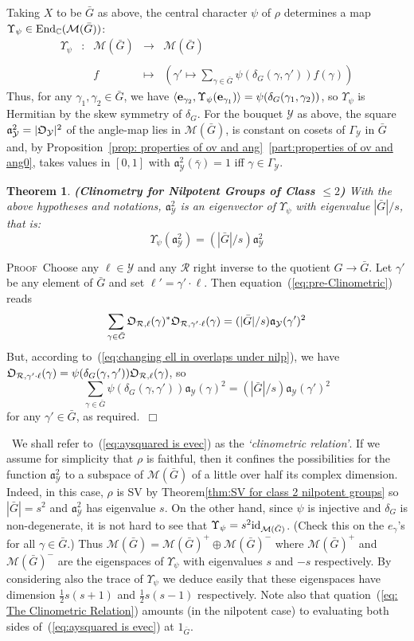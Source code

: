 \documentclass[12pt]{article}
\newtheorem{thm}{Theorem}[section]
\newcommand{\bbC}{\ensuremath{\mathbb{C}}}\newcommand{\bbCp}{\ensuremath{\mathbb{C}_p}}
\newcommand{\be}{\ensuremath{{\bf e}}}
\newcommand{\bPf}{\noindent \textsc{Proof\ }}
\newcommand{\cM}{\mathcal{M}}
\newcommand{\cR}{\ensuremath{\mathcal{R}}}
\newcommand{\cY}{\ensuremath{\mathcal{Y}}}
\newcommand{\displaymapdef}[5]
{
	\begin{array}{rcrcl}
		#1 &:& #2 &\longrightarrow& #3 \\
		& &    &                    \\
		& & #4 &\longmapsto    & #5
	\end{array}
}
\newcommand{\End}{{\rm End}}
\newcommand{\ePf}{~$\Box$\vertsp\par}%
\newcommand{\fa}{\ensuremath{\mathfrak{a}}}
\newcommand{\half}{\frac{1}{2}}
\newcommand{\id}{{\rm id}}
\renewcommand{\rem}{\refstepcounter{rem}\noindent{\sc Remark \therem}}
\renewcommand{\therem}{\thesection.\arabic{rem}}
\newcommand{\vertsp}{\vspace{1ex}}
\newcommand{\barG}{\ensuremath{\bar{G}}}
\newcommand{\cAng}{{\frak O}}
\begin{document}
Taking $X$ to be $\bar G$ as above, the central character $\psi$ of $\rho$ determines a map $\Upsilon_\psi\in\End_\bbC(\cM(\bar G))$: 
$$
\displaymapdef{\Upsilon_\psi}{\cM(\bar G)}{\cM(\bar G)}{f}
{\left(\gamma'\mapsto \sum_{\gamma\in \bar G }\psi(\delta_G(\gamma,\gamma'))f(\gamma)\right)}
$$
Thus, for any $\gamma_1,\gamma_2\in \bar G$, we have $\left\langle \be_{\gamma_2}, \Upsilon_\psi(\be_{\gamma_1})\right\rangle =\psi(\delta_G(\gamma_1,\gamma_2))$, so $\Upsilon_\psi$ is Hermitian by the skew symmetry of $\delta_G$. 
For the bouquet $\cY$ as above, the square $\fa_\cY^2=|\cAng_\cY|^2$ of the angle-map lies in $\cM(\bar G)$, is constant on cosets of $\Gamma_\cY$ in $\barG$ and, by Proposition~\ref{prop: properties of ov and ang}~\ref{part:properties of ov and ang0}, takes values in $[0,1]$ with
$\fa_\cY^2(\bar{\gamma})=1$ iff $\gamma\in\Gamma_\cY$.
\begin{thm}\label{thm:clinomteric thm for nilp gps}{\bf (Clinometry for Nilpotent Groups of Class $\leq 2$)}
With the above hypotheses and notations, $\fa_\cY^2$ is an eigenvector of $\Upsilon_\psi$ with eigenvalue $|\bar G|/s$, that is:
\begin{equation}\label{eq:aysquared is evec}
\Upsilon_\psi(\fa_\cY^2)=
(|\bar G|/s)\fa_\cY^2
\end{equation} 
\end{thm}
\bPf Choose any $\ell\in\cY$ and any $\cR$ right inverse to the quotient $G\rightarrow \barG$. Let $\gamma'$ be any element of $\barG$ and 
set $\ell'=\gamma'\cdot \ell$. Then equation~(\ref{eq:pre-Clinometric}) reads 
$$
\sum_{\gamma\in\bar{G}}
\cAng_{\cR,\ell}(\gamma)^\ast\cAng_{\cR,\gamma'\cdot \ell}(\gamma)=
(|\barG|/s)\fa_\cY(\gamma')^2
$$
But, according to~(\ref{eq:changing ell in overlaps under nilp}),  we have 
$
\cAng_{\cR,\gamma'\cdot \ell}(\gamma)=
\psi(\delta_G(\gamma,\gamma'))\cAng_{\cR,\ell}(\gamma) 
$, 
so 
$$
\sum_{\gamma\in\bar{G}}
\psi(\delta_G(\gamma,\gamma'))\fa_\cY(\gamma)^2=
(|\barG|/s)\fa_\cY(\gamma')^2
$$
for any $\gamma'\in\barG$, as required.\ePf 
\rem\ We shall refer to~(\ref{eq:aysquared is evec}) as the {\em  `clinometric relation'}. 
If we assume for simplicity that $\rho$ is faithful, then it confines the possibilities for the function $\fa_\cY^2$ to a subspace 
of $\cM(\barG)$ of a little over half its complex dimension. Indeed, in this case,  $\rho$ is SV by Theorem\ref{thm:SV for class 2 nilpotent groups} so $|\barG|=s^2$ and $\fa_\cY^2$ has eigenvalue $s$. On the other hand, since $\psi$ is injective and $\delta_G$ is non-degenerate, it is not hard to see that $\Upsilon_\psi=s^2 \id_{\cM(\barG)}$. (Check this on the $e_\gamma$'s for all $\gamma\in\barG$.) Thus $\cM(\barG)=\cM(\barG)^+\oplus \cM(\barG)^-$ where $\cM(\barG)^+$ and $\cM(\barG)^-$ are the eigenspaces of $\Upsilon_\psi$ with eigenvalues $s$ and $-s$ respectively. By considering also the trace of $\Upsilon_\psi$ we deduce easily that these eigenspaces have dimension $\half s(s+1)$ and $\half s(s-1)$ respectively. Note also that quation~(\ref{eq: The Clinometric Relation}) amounts (in the nilpotent case) to evaluating both sides of~(\ref{eq:aysquared is evec}) at $1_{\bar G}$. 
\end{document}
